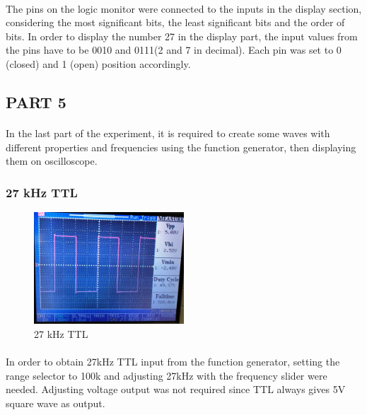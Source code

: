 \documentclass[pdftex,12pt,a4paper]{article}
\begin{document}
\begin{flushleft}
\paragraph{}
The pins on the logic monitor were connected to the inputs in the display section, considering the most significant bits, the least significant bits and the order of bits. In order to display the number 27 in the display part, the input values from the pins have to be 0010 and 0111(2 and 7 in decimal). Each pin was set to 0 (closed) and 1 (open) position accordingly.

\end{flushleft}

\begin{flushleft}
\subsection{PART 5}
\end{flushleft}
\begin{flushleft}
\paragraph{}
In the last part of the experiment, it is required to create some waves with different properties and frequencies using the function generator, then displaying them on oscilloscope.

\end{flushleft}

\begin{flushleft}
\subsubsection{27 kHz TTL}
\begin{figure}[h]
    \centering
	\includegraphics[width=0.5\textwidth]{Photos/5_1_closeup.jpg}
	\caption{27 kHz TTL}
	\label{fig4}
\end{figure}

\paragraph{}
In order to obtain 27kHz TTL input from the function generator, setting the range selector to 100k and adjusting 27kHz with the frequency slider were needed. Adjusting voltage output was not required since TTL always gives 5V square wave as output.
\end{flushleft}
\end{document}
